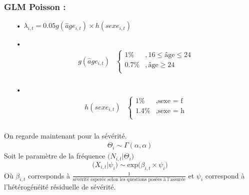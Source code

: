 \subsubsection*{GLM Poisson :}
\begin{itemize}
\item[•] $\lambda_{i,t} = 0.05 g(\widehat{a}ge_{i,t}) \times h(sexe_{i,t})$
\item[•] \begin{align*}
g(\widehat{a}ge_{i,t}) & \left\{
     \begin{array}{rl}
      1 \% &, 16 \leq \text{âge} \leq 24\\
      0.7 \% &, \text{âge} \geq 24 \\
     \end{array}
     \right. \\
\end{align*}
\item[•] \begin{align*}
h(sexe_{i,t}) & \left\{
     \begin{array}{rl}
      1 \% &, \text{sexe = f} \\
      1.4 \% &, \text{sexe = h}  \\
     \end{array}
     \right. \\
\end{align*}
\end{itemize}
On regarde maintenant pour la sévérité.
\begin{align*}
\Theta_i \sim \Gamma(\alpha, \alpha)
\end{align*}
Soit le paramètre de la fréquence $\Big( N_{i,t}|\Theta_i \Big)$
\begin{equation}
\label{eq:exemple:bayes}
\Bigg( X_{i,t}|\psi_i \Bigg) \sim \text{exp} \Big( \beta _{i,t} \times \psi_i \Big) 
\end{equation}
Où $\beta _{i,t}$ corresponds à $\frac{1}{\text{sévérité esperée selon les questions posées à l'assurée}}$ et $\psi_i$ correspond à l'hétérogénéité résiduelle de sévérité.

